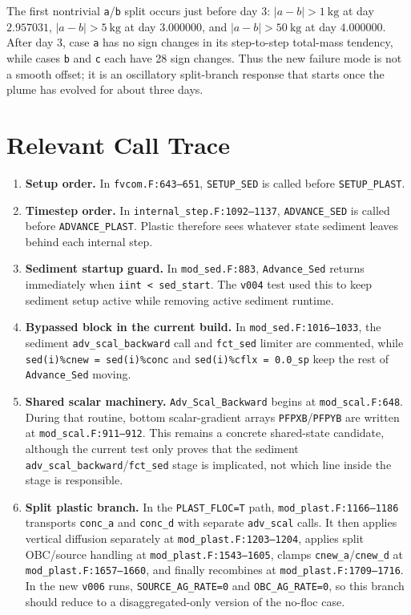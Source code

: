 \documentclass[11pt]{article}
\begin{document}
The first nontrivial \texttt{a}/\texttt{b} split occurs just before day 3:
\(|a-b|>1~\mathrm{kg}\) at day \(2.957031\), \(|a-b|>5~\mathrm{kg}\) at day
\(3.000000\), and \(|a-b|>50~\mathrm{kg}\) at day \(4.000000\).  After day 3,
case \texttt{a} has no sign changes in its step-to-step total-mass tendency,
while cases \texttt{b} and \texttt{c} each have 28 sign changes.  Thus the new
failure mode is not a smooth offset; it is an oscillatory split-branch response
that starts once the plume has evolved for about three days.

\section*{Relevant Call Trace}
\begin{enumerate}
\item \textbf{Setup order.} In \texttt{fvcom.F:643--651},
\texttt{SETUP\_SED} is called before \texttt{SETUP\_PLAST}.

\item \textbf{Timestep order.} In \texttt{internal\_step.F:1092--1137},
\texttt{ADVANCE\_SED} is called before \texttt{ADVANCE\_PLAST}.  Plastic
therefore sees whatever state sediment leaves behind each internal step.

\item \textbf{Sediment startup guard.} In \texttt{mod\_sed.F:883},
\texttt{Advance\_Sed} returns immediately when \texttt{iint < sed\_start}.  The
\texttt{v004} test used this to keep sediment setup active while removing
active sediment runtime.

\item \textbf{Bypassed block in the current build.} In
\texttt{mod\_sed.F:1016--1033}, the sediment
\texttt{adv\_scal\_backward} call and \texttt{fct\_sed} limiter are commented,
while \texttt{sed(i)\%cnew = sed(i)\%conc} and
\texttt{sed(i)\%cflx = 0.0\_sp} keep the rest of \texttt{Advance\_Sed} moving.

\item \textbf{Shared scalar machinery.} \texttt{Adv\_Scal\_Backward} begins at
\texttt{mod\_scal.F:648}.  During that routine, bottom scalar-gradient arrays
\texttt{PFPXB}/\texttt{PFPYB} are written at
\texttt{mod\_scal.F:911--912}.  This remains a concrete shared-state candidate,
although the current test only proves that the sediment
\texttt{adv\_scal\_backward}/\texttt{fct\_sed} stage is implicated, not which
line inside the stage is responsible.

\item \textbf{Split plastic branch.} In the \texttt{PLAST\_FLOC=T} path,
\texttt{mod\_plast.F:1166--1186} transports \texttt{conc\_a} and
\texttt{conc\_d} with separate \texttt{adv\_scal} calls.  It then applies
vertical diffusion separately at \texttt{mod\_plast.F:1203--1204}, applies
split OBC/source handling at \texttt{mod\_plast.F:1543--1605}, clamps
\texttt{cnew\_a}/\texttt{cnew\_d} at \texttt{mod\_plast.F:1657--1660}, and
finally recombines at \texttt{mod\_plast.F:1709--1716}.  In the new
\texttt{v006} runs, \texttt{SOURCE\_AG\_RATE=0} and
\texttt{OBC\_AG\_RATE=0}, so this branch should reduce to a disaggregated-only
version of the no-floc case.


\end{enumerate}
\end{document}

